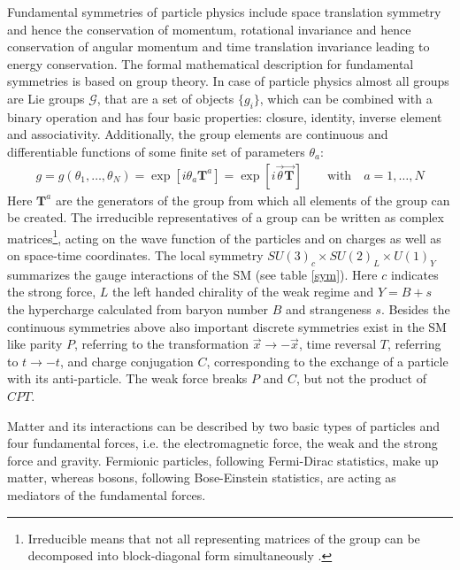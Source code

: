 Fundamental symmetries of particle physics include space translation symmetry and hence the conservation of momentum, rotational invariance and hence conservation of angular momentum and time translation invariance leading to energy conservation. The formal mathematical description for fundamental symmetries is based on group theory. In case of particle physics almost all groups are Lie groups $\mathcal{G}$, that are a set of objects $\{g_i\}$, which can be combined with a binary operation and has four basic properties: closure, identity, inverse element and associativity. Additionally, the group elements are continuous and differentiable functions of some finite set of parameters $\theta_{a}$:
\begin{align}
                g=g(\theta_1, \ldots, \theta_N)=\exp\left[i\theta_a\mathbf{T}^a\right]=\exp\left[i\vec{\theta}\vec{\mathbf{T}}\right]\qquad \text{with}\quad a=1,\ldots,N
\end{align}
Here $\mathbf{T}^a$ are the generators of the group from which all elements of the group can be created. The irreducible representatives of a group can be written as complex matrices\footnote{Irreducible means that not all representing matrices of the group can be decomposed into block-diagonal form simultaneously \cite{Mann}.}, acting on the wave function of the particles and on charges as well as on space-time coordinates. \cite{Mann}
The local symmetry $SU(3)_c\times SU(2)_L\times U(1)_Y$ summarizes the gauge interactions of the SM (see table \ref{sym}). Here $c$ indicates the strong force, $L$ the left handed chirality of the weak regime and $Y=B+s$ the hypercharge calculated from baryon number $B$ and strangeness $s$. \cite{PhysTeV} Besides the continuous symmetries above also important discrete symmetries exist in the SM like parity $P$, referring to the transformation $\vec{x}\rightarrow-\vec{x}$, time reversal $T$, referring to $t\rightarrow-t$, and charge conjugation $C$, corresponding to the exchange of a particle with its anti-particle. The weak force breaks $P$ and $C$, but not the product of $CPT$. \cite{Nair}\par
Matter and its interactions can be described by two basic types of particles and four fundamental forces, i.e. the electromagnetic force, the weak and the strong force and gravity. Fermionic particles, following Fermi-Dirac statistics, make up matter, whereas bosons, following Bose-Einstein statistics, are acting as mediators of the fundamental forces. \cite{Cottingham}\cite{Griffiths}\newline
